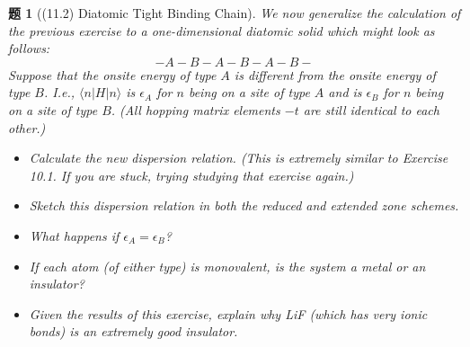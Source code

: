 \documentclass[UTF8,10pt,a4paper]{article}
\theoremstyle{Problem}
\newtheorem{prob}{题}
\theoremstyle{Solution}
\begin{document}
\begin{prob}[(11.2) Diatomic Tight Binding Chain]
    We now generalize the calculation of the previous exercise to a one-dimensional diatomic solid which might look as follows:
    \[
        -A-B-A-B-A-B-
    \]
    Suppose that the onsite energy of type $A$ is different from the onsite energy of type $B$. I.e., $\langle n\rvert H\lvert n\rangle$ is $\epsilon_A$ for $n$ being on a site of type $A$ and is $\epsilon_B$ for $n$ being on a site of type $B$. (All hopping matrix elements $-t$ are still identical to each other.)
    \begin{itemize}
        \item[$\triangleright$] Calculate the new dispersion relation. (This is extremely similar to Exercise 10.1. If you are stuck, trying studying that exercise again.)
        \item[$\triangleright$] Sketch this dispersion relation in both the reduced and extended zone schemes.
        \item[$\triangleright$] What happens if $\epsilon_A=\epsilon_B$?
        \item[$\triangleright$] If each atom (of either type) is monovalent, is the system a metal or an insulator?
        \item[$\triangleright^*$] Given the results of this exercise, explain why LiF (which has very ionic bonds) is an extremely good insulator.
    \end{itemize}
\end{prob}
\end{document}
